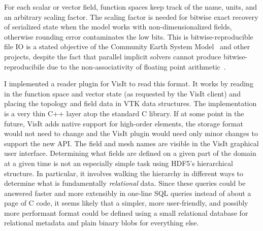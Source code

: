 For each scalar or vector field, function spaces keep track of the name, units, and an arbitrary scaling factor.
The scaling factor is needed for bitwise exact recovery of serialized state when the model works with non-dimensionalized fields, otherwise rounding error contaminates the low bits.
This is bitwise-reproducible file IO is a stated objective of the Community Earth System Model~\citep*{cesm} and other projects, despite the fact that parallel implicit solvers cannot produce bitwise-reproducibile due to the non-associativity of floating point arithmetic~\citep{whatevery}.

I implemented a reader plugin for VisIt to read this format.
It works by reading in the function space and vector state (as requested by the VisIt client) and placing the topology and field data in VTK data structures.
The implementation is a very thin C++ layer atop the standard C library.
If at some point in the future, VisIt adds native support for high-order elements, the storage format would not need to change and the VisIt plugin would need only minor changes to support the new API.
The field and mesh names are visible in the VisIt graphical user interface.
Determining what fields are defined on a given part of the domain at a given time is not an especially simple task using HDF5's hierarchical structure.
In particular, it involves walking the hierarchy in different ways to determine what is fundamentally \emph{relational} data.
Since these queries could be answered faster and more extensibly in one-line SQL queries instead of about a page of C code, it seems likely that a simpler, more user-friendly, and possibly more performant format could be defined using a small relational database for relational metadata and plain binary blobs for everything else.
